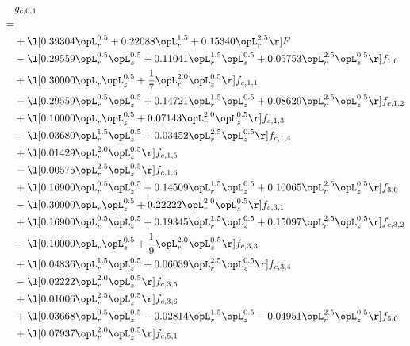 \begin{alignat}{2} 
\label{eq:g_01_0} 
& g_{c,0,1} \nonumber \\ 
 = \\ 
& + \l[  0.39304 \opL_r^{0.5} +  0.22088 \opL_r^{1.5} +  0.15340 \opL_r^{2.5}  \r] F \nonumber \\ 
& - \l[  0.29559 \opL_r^{0.5} \opL_z^{0.5} +  0.11041 \opL_r^{1.5} \opL_z^{0.5} +  0.05753 \opL_r^{2.5} \opL_z^{0.5}  \r] f_{1,0} \nonumber \\ 
& + \l[  0.30000 \opL_r \opL_z^{0.5} + \frac{1}{7} \opL_r^{2.0} \opL_z^{0.5}  \r] f_{c,1,1} \nonumber \\ 
& - \l[  0.29559 \opL_r^{0.5} \opL_z^{0.5} +  0.14721 \opL_r^{1.5} \opL_z^{0.5} +  0.08629 \opL_r^{2.5} \opL_z^{0.5}  \r] f_{c,1,2} \nonumber \\ 
& + \l[  0.10000 \opL_r \opL_z^{0.5} +  0.07143 \opL_r^{2.0} \opL_z^{0.5}  \r] f_{c,1,3} \nonumber \\ 
& - \l[  0.03680 \opL_r^{1.5} \opL_z^{0.5} +  0.03452 \opL_r^{2.5} \opL_z^{0.5}  \r] f_{c,1,4} \nonumber \\ 
& + \l[  0.01429 \opL_r^{2.0} \opL_z^{0.5}  \r] f_{c,1,5} \nonumber \\ 
& - \l[  0.00575 \opL_r^{2.5} \opL_z^{0.5}  \r] f_{c,1,6} \nonumber \\ 
& + \l[  0.16900 \opL_r^{0.5} \opL_z^{0.5} +  0.14509 \opL_r^{1.5} \opL_z^{0.5} +  0.10065 \opL_r^{2.5} \opL_z^{0.5}  \r] f_{3,0} \nonumber \\ 
& - \l[  0.30000 \opL_r \opL_z^{0.5} +  0.22222 \opL_r^{2.0} \opL_z^{0.5}  \r] f_{c,3,1} \nonumber \\ 
& + \l[  0.16900 \opL_r^{0.5} \opL_z^{0.5} +  0.19345 \opL_r^{1.5} \opL_z^{0.5} +  0.15097 \opL_r^{2.5} \opL_z^{0.5}  \r] f_{c,3,2} \nonumber \\ 
& - \l[  0.10000 \opL_r \opL_z^{0.5} + \frac{1}{9} \opL_r^{2.0} \opL_z^{0.5}  \r] f_{c,3,3} \nonumber \\ 
& + \l[  0.04836 \opL_r^{1.5} \opL_z^{0.5} +  0.06039 \opL_r^{2.5} \opL_z^{0.5}  \r] f_{c,3,4} \nonumber \\ 
& - \l[  0.02222 \opL_r^{2.0} \opL_z^{0.5}  \r] f_{c,3,5} \nonumber \\ 
& + \l[  0.01006 \opL_r^{2.5} \opL_z^{0.5}  \r] f_{c,3,6} \nonumber \\ 
& + \l[  0.03668 \opL_r^{0.5} \opL_z^{0.5}   -0.02814 \opL_r^{1.5} \opL_z^{0.5}   -0.04951 \opL_r^{2.5} \opL_z^{0.5}  \r] f_{5,0} \nonumber \\ 
& + \l[  0.07937 \opL_r^{2.0} \opL_z^{0.5}  \r] f_{c,5,1} \nonumber \\ 

\end{alignat}
